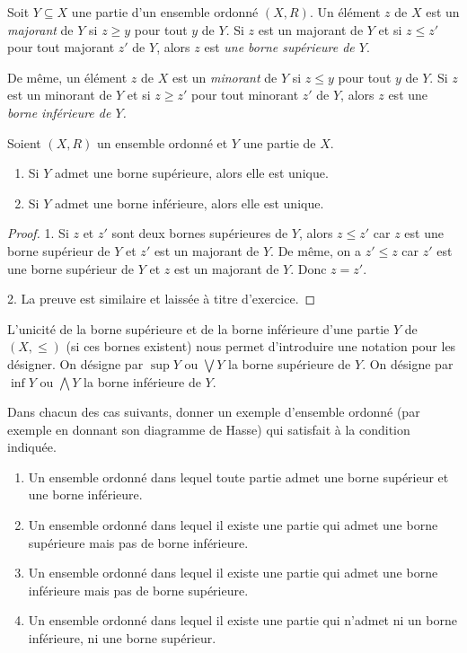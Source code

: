 \documentclass[french,course,oneside,theoremnosection]{lecture}
\begin{document}
\begin{definition}
Soit $Y \subseteq X$ une partie d'un ensemble ordonné $(X,R)$. Un élément $z$ de $X$ est un \emph{majorant} de $Y$ si
$z\geq y$ pour tout $y$ de $Y$. Si $z$ est un majorant de $Y$ et si $z\leq z'$ pour tout majorant $z'$ de $Y$, alors $z$ est \emph{une borne supérieure de $Y$}.

De même, un élément $z$ de $X$ est un \emph{minorant} de $Y$ si $z\leq y$ pour tout $y$ de $Y$. Si $z$ est un minorant de $Y$ et si $z\geq z'$ pour tout minorant $z'$ de $Y$, alors $z$ est une \emph{borne inférieure de $Y$.}
\end{definition}

\begin{proposition}\label{prop:supuni}
Soient $(X,R)$ un ensemble ordonné et $Y$ une partie de $X$.
\begin{enumerate}
\item Si $Y$ admet une borne supérieure, alors elle est unique.
\item Si $Y$ admet une borne inférieure, alors elle est unique.
\end{enumerate}
\end{proposition}

\begin{proof}
1. Si $z$ et $z'$ sont deux bornes supérieures de $Y$, alors $z\leq z'$ car $z$ est une borne supérieur de $Y$ et $z'$ est un majorant de $Y$. De même, on a $z'\leq z$ car $z'$ est une borne supérieur de $Y$ et $z$ est un majorant de $Y$. Donc $z=z'$.

2. La preuve est similaire et laissée à titre d'exercice.
\end{proof}
\begin{notation}
L'unicité de la borne supérieure et de la borne inférieure d'une partie $Y$ de $(X,\leq)$ (si ces bornes existent) nous permet d'introduire une notation pour les désigner. On désigne par $\sup Y$ ou $\bigvee Y$ la borne supérieure de $Y$. On désigne par $\inf Y$ ou $\bigwedge Y$ la borne inférieure de $Y$.
\end{notation}

\begin{exercise}
Dans chacun des cas suivants, donner un exemple d'ensemble ordonné (par exemple en donnant son diagramme de Hasse) qui satisfait à la condition indiquée.
\begin{enumerate}
\item Un ensemble ordonné dans lequel toute partie admet une borne supérieur et une borne inférieure.
\item Un ensemble ordonné dans lequel il existe une partie qui admet une borne supérieure mais pas de borne inférieure.
\item Un ensemble ordonné dans lequel il existe une partie qui admet une borne inférieure mais pas de borne supérieure.
\item Un ensemble ordonné dans lequel il existe une partie qui n'admet ni un borne inférieure, ni une borne supérieur.
\end{enumerate}
\end{exercise}
\end{document}
